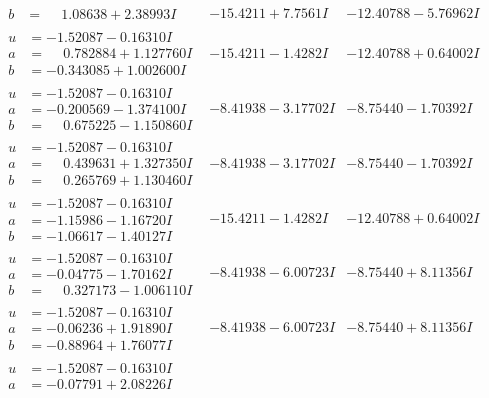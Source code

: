 \documentclass[1p]{elsarticle_modified}
\theoremstyle{definition}
\begin{document}
$$\begin{array}{c|c|c}
\begin{aligned}
b &= \phantom{-}1.08638 + 2.38993 I\end{aligned}
 & -15.4211 + 7.7561 I & -12.40788 - 5.76962 I \\ \hline\begin{aligned}
u &= -1.52087 - 0.16310 I \\
a &= \phantom{-}0.782884 + 1.127760 I \\
b &= -0.343085 + 1.002600 I\end{aligned}
 & -15.4211 - 1.4282 I & -12.40788 + 0.64002 I \\ \hline\begin{aligned}
u &= -1.52087 - 0.16310 I \\
a &= -0.200569 - 1.374100 I \\
b &= \phantom{-}0.675225 - 1.150860 I\end{aligned}
 & -8.41938 - 3.17702 I & -8.75440 - 1.70392 I \\ \hline\begin{aligned}
u &= -1.52087 - 0.16310 I \\
a &= \phantom{-}0.439631 + 1.327350 I \\
b &= \phantom{-}0.265769 + 1.130460 I\end{aligned}
 & -8.41938 - 3.17702 I & -8.75440 - 1.70392 I \\ \hline\begin{aligned}
u &= -1.52087 - 0.16310 I \\
a &= -1.15986 - 1.16720 I \\
b &= -1.06617 - 1.40127 I\end{aligned}
 & -15.4211 - 1.4282 I & -12.40788 + 0.64002 I \\ \hline\begin{aligned}
u &= -1.52087 - 0.16310 I \\
a &= -0.04775 - 1.70162 I \\
b &= \phantom{-}0.327173 - 1.006110 I\end{aligned}
 & -8.41938 - 6.00723 I & -8.75440 + 8.11356 I \\ \hline\begin{aligned}
u &= -1.52087 - 0.16310 I \\
a &= -0.06236 + 1.91890 I \\
b &= -0.88964 + 1.76077 I\end{aligned}
 & -8.41938 - 6.00723 I & -8.75440 + 8.11356 I \\ \hline\begin{aligned}
u &= -1.52087 - 0.16310 I \\
a &= -0.07791 + 2.08226 I \\

\end{aligned}
\end{array}$$
\end{document}
